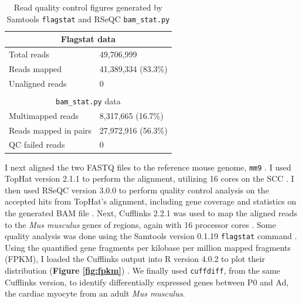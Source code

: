 \documentclass{article}
\begin{document}
\begin{table}[!h]
\centering
\begin{tabular}{ll}
\hline
\multicolumn{2}{|c|}{Flagstat data}                                                    \\ \hline\hline
\multicolumn{1}{|l|}{Total reads}           & \multicolumn{1}{l|}{49,706,999}          \\ \hline
\multicolumn{1}{|l|}{Reads mapped}          & \multicolumn{1}{l|}{41,389,334 (83.3\%)} \\ \hline
\multicolumn{1}{|l|}{Unaligned reads}       & \multicolumn{1}{l|}{0}                   \\ \hline
                                            &                                          \\ \hline
\multicolumn{2}{|c|}{\texttt{bam\_stat.py} data}                                                    \\ \hline\hline
\multicolumn{1}{|l|}{Multimapped reads}     & \multicolumn{1}{l|}{8,317,665 (16.7\%)}  \\ \hline
\multicolumn{1}{|l|}{Reads mapped in pairs} & \multicolumn{1}{l|}{27,972,916 (56.3\%)} \\ \hline
\multicolumn{1}{|l|}{QC failed reads}       & \multicolumn{1}{l|}{0}                   \\ \hline
\end{tabular}
\caption{Read quality control figures generated by Samtools \texttt{flagstat} and RSeQC \texttt{bam\_stat.py}}
\label{tab:flagstat}
\end{table}

I next aligned the two FASTQ files to the reference mouse genome, \texttt{mm9} \cite{MGSCv37Mm9Genome}. I used TopHat version 2.1.1 to perform the alignment, utilizing 16 cores on the SCC \cite{trapnellTopHatDiscoveringSplice2009}. I then used RSeQC version 3.0.0 to perform quality control analysis on the accepted hits from TopHat's alignment, including gene coverage and statistics on the generated BAM file \cite{RSeQCRNAseqQuality}. Next, Cufflinks 2.2.1 was used to map the aligned reads to the \textit{Mus musculus} genes of regions, again with 16 processor cores \cite{trapnellTranscriptAssemblyQuantification2010}. Some quality analysis was done using the Samtools version 0.1.19 \texttt{flagstat} command \cite{danecekTwelveYearsSAMtools2021}. Using the quantified gene fragments per kilobase per million mapped fragments (FPKM), I loaded the Cufflinks output into R version 4.0.2 to plot their distribution (\textbf{Figure \ref{fig:fpkm}}) \cite{rlang}. We finally used \texttt{cuffdiff}, from the same Cufflinks version, to identify differentially expressed genes between P0 and Ad, the cardiac myocyte from an adult \textit{Mus musculus}.
\end{document}
